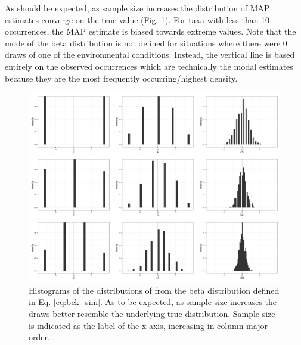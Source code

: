 \documentclass[12pt,letterpaper]{article}
\begin{document}
As should be expected, as sample size increases the distribution of MAP estimates converge on the true value (Fig. \ref{fig:env_mode}). For taxa with less than 10 occurrences, the MAP estimate is biased towards extreme values. Note that the mode of the beta distribution is not defined for situations where there were 0 draws of one of the environmental conditions. Instead, the vertical line is based entirely on the observed occurrences which are technically the modal estimates because they are the most frequently occurring/highest density.
\begin{figure}[ht]
  \centering
  \includegraphics[height = \textheight,width=\textwidth,keepaspectratio=true]{figure/env_mode_dist}
  \caption{Histograms of the distributions of from the beta distribution defined in Eq. \ref{eq:bck_sim}. As to be expected, as sample size increases the draws better resemble the underlying true distribution. Sample size is indicated as the label of the x-axis, increasing in column major order.}
  \label{fig:env_mode}
\end{figure}
\end{document}
